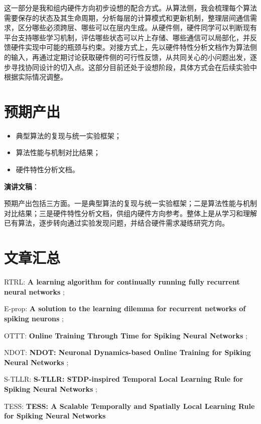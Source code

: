 \documentclass[journal,12pt,onecolumn]{IEEEtran}
\begin{document}
这一部分是我和组内硬件方向初步设想的配合方式。从算法侧，我会梳理每个算法需要保存的状态及其生命周期，分析每层的计算模式和更新机制，整理层间通信需求，区分哪些必须跨层、哪些可以在层内生成。从硬件侧，硬件同学可以判断现有平台支持哪些学习机制，评估哪些状态可以片上存储、哪些通信可以局部化，并反馈硬件实现中可能的瓶颈与约束。对接方式上，先以硬件特性分析文档作为算法侧的输入，再通过定期讨论获取硬件侧的可行性反馈，从共同关心的小问题出发，逐步寻找协同设计的切入点。这部分目前还处于设想阶段，具体方式会在后续实验中根据实际情况调整。


\section{预期产出}

\begin{itemize}
    \item 典型算法的复现与统一实验框架；
    \item 算法性能与机制对比结果；
    \item 硬件特性分析文档。
\end{itemize}

\textbf{演讲文稿}：

预期产出包括三方面。一是典型算法的复现与统一实验框架；二是算法性能与机制对比结果；三是硬件特性分析文档，供组内硬件方向参考。整体上是从学习和理解已有算法，逐步转向通过实验发现问题，并结合硬件需求凝练研究方向。


\section*{文章汇总}

RTRL: \textbf{A learning algorithm for continually running fully recurrent neural networks} \cite{williams1989learning};

E-prop: \textbf{A solution to the learning dilemma for recurrent networks of spiking neurons} \cite{bellec_solution_2020};

OTTT: \textbf{Online Training Through Time for Spiking Neural Networks} \cite{xiao_online_2022};

NDOT: \textbf{NDOT: Neuronal Dynamics-based Online Training for Spiking Neural Networks} \cite{jiang_ndot_nodate};

S-TLLR: \textbf{S-TLLR: STDP-inspired Temporal Local Learning Rule for Spiking Neural Networks} \cite{apolinario_s-tllr_2024};

TESS: \textbf{TESS: A Scalable Temporally and Spatially Local Learning Rule for Spiking Neural Networks} \cite{apolinario_tess_2025}



\end{document}
